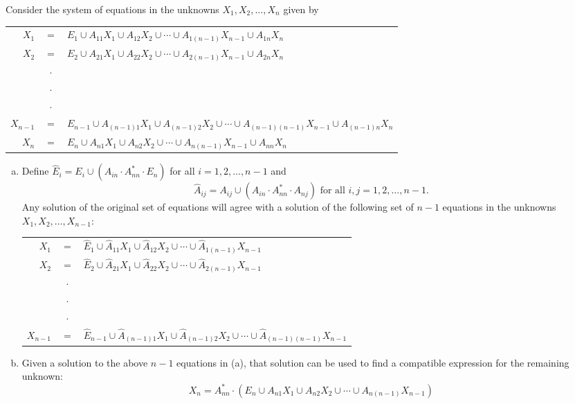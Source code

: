 \begin{lmm}\label{lmm-8.5}
Consider the system of equations in the unknowns $X_1,X_2,\ldots,X_n$ given by
\begin{center}\begin{tabular}{r@{ }c@{ }l}
$X_1$ & $=$ & $E_1\cup A_{11}X_1\cup A_{12}X_2\cup\cdots\cup A_{1(n-1)}X_{n-1}
	\cup A_{1n}X_n$ \\
$X_2$ & $=$ & $E_2\cup A_{21}X_{1}\cup A_{22}X_2\cup\cdots\cup A_{2(n-1)}X_{n-1}
	\cup A_{2n}X_n$ \\
& $\cdot$ \\
& $\cdot$ \\
& $\cdot$ \\
$X_{n-1}$ & $=$ & $E_{n-1}\cup A_{(n-1)1}X_1\cup A_{(n-1)2}X_2\cup\cdots\cup
	A_{(n-1)(n-1)}X_{n-1}\cup A_{(n-1)n}X_n$ \\
$X_n$ & $=$ & $E_n\cup A_{n1}X_1\cup A_{n2}X_2\cup\cdots\cup A_{n(n-1)}X_{n-1}
	\cup A_{nn}X_n$
\end{tabular}\end{center}
\begin{enumerate}[a.]
\item Define $\hat{E}_i = E_i\cup (A_{in}\cdot A^*_{nn}\cdot E_n)$ for all $i =
1,2,\ldots,n-1$ and
\[ \hat{A}_{ij}=A_{ij}\cup(A_{in}\cdot A^*_{nn}\cdot A_{nj})\text{ for all }i,j
	= 1,2,\ldots,n-1. \]
Any solution of the original set of equations will agree with a solution of
the following set of $n-1$ equations in the unknowns $X_1,X_2,\ldots,X_{n-1}$:
\begin{center}\begin{tabular}{r@{ }c@{ }l}
$X_1$ & $=$ & $\hat{E}_1\cup \hat{A}_{11}X_1\cup\hat{A}_{12}X_2\cup\cdots\cup
	\hat{A}_{1(n-1)}X_{n-1}$ \\
$X_2$ & $=$ & $\hat{E}_2\cup \hat{A}_{21}X_{1}\cup\hat{A}_{22}X_2\cup\cdots\cup
	\hat{A}_{2(n-1)}X_{n-1}$ \\
& $\cdot$ \\
& $\cdot$ \\
& $\cdot$ \\
$X_{n-1}$ & $=$ & $\hat{E}_{n-1}\cup \hat{A}_{(n-1)1}X_1\cup\hat{A}_{(n-1)2}X_2
	\cup\cdots\cup\hat{A}_{(n-1)(n-1)}X_{n-1}$
\end{tabular}\end{center}

\item Given a solution to the above $n-1$ equations in (a), that solution can be
used to find a compatible expression for the remaining unknown:
\[ X_n=A^*_{nn}\cdot(E_n\cup A_{n1}X_1\cup A_{n2}X_2\cup\cdots\cup A_{n(n-1)}
	X_{n-1}) \]


\end{enumerate}
\end{lmm}
